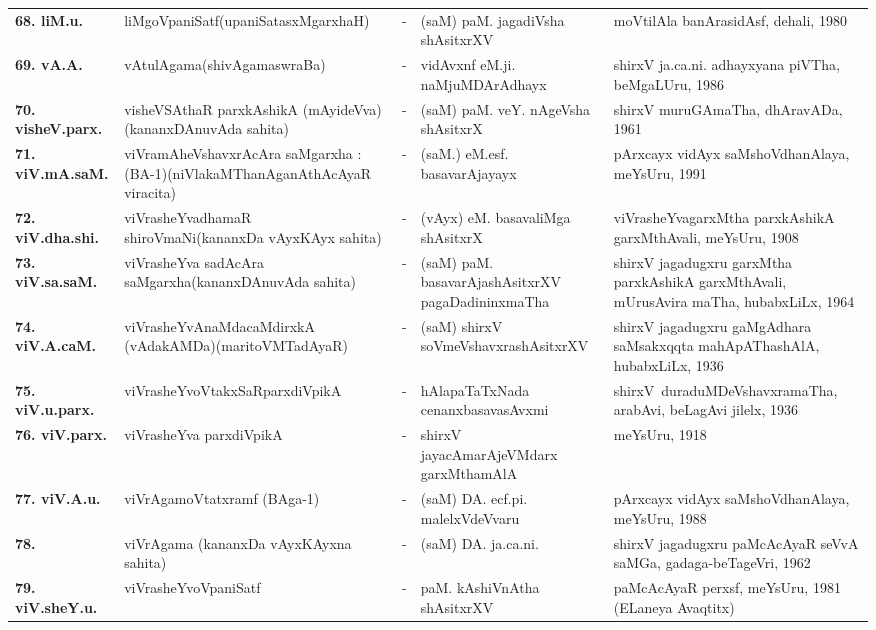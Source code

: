 {\begin{longtable}{lp{5cm}cp{5cm}<{\raggedright}p{3cm}<{\raggedright}@{}}
{\bf 68. liM.u.} & liMgoVpaniSatf\newline (upaniSatasxMgarxhaH) &-& (saM) paM. jagadiVsha shAsitxrXV & moVtilAla banArasidAsf, dehali, 1980\\
{\bf 69. vA.A.} & vAtulAgama\newline (shivAgamaswraBa) &-& vidAvxnf eM.ji. naMjuMDArAdhayx & shirxV ja.ca.ni. adhayxyana piVTha, beMgaLUru, 1986\\
{\bf 70. visheV.parx.} & visheVSAthaR parxkAshikA (mAyideVva)\newline (kananxDAnuvAda sahita) &-& (saM) paM. veY. nAgeVsha shAsitxrX & shirxV muruGAmaTha, dhAravADa, 1961\\
{\bf 71. viV.mA.saM.} & viVramAheVshavxrAcAra saMgarxha : (BA-1)\newline (niVlakaMThanAganAthAcAyaR viracita) &-& (saM.) eM.esf. basavarAjayayx & pArxcayx vidAyx saMshoVdhanAlaya, meYsUru, 1991\\
{\bf 72. viV.dha.shi.} & viVrasheYvadhamaR shiroVmaNi\newline (kananxDa vAyxKAyx sahita) &-& (vAyx) eM. basavaliMga shAsitxrX & viVrasheYvagarxMtha parxkAshikA garxMthAvali, meYsUru, 1908\\
{\bf 73. viV.sa.saM.} & viVrasheYva sadAcAra saMgarxha\newline (kananxDAnuvAda sahita) &-& (saM) paM. basavarAjashAsitxrXV pagaDadininxmaTha & shirxV jagadugxru garxMtha parxkAshikA garxMthAvali, mUrusAvira maTha, hubabxLiLx, 1964\\
{\bf 74. viV.A.caM.} & viVrasheYvAnaMdacaMdirxkA (vAdakAMDa)\newline (maritoVMTadAyaR) &-& (saM) shirxV soVmeVshavxrashAsitxrXV & shirxV jagadugxru gaMgAdhara saMsakxqqta mahApAThashAlA, hubabxLiLx, 1936\\
{\bf 75. viV.u.parx.} & viVrasheYvoVtakxSaRparxdiVpikA &-& hAlapaTaTxNada cenanxbasavasAvxmi & \hbox{shirxV duraduMDeVshavxra}\-maTha, arabAvi, beLagAvi jilelx, 1936\\
{\bf 76. viV.parx.} & viVrasheYva parxdiVpikA &-& shirxV jayacAmarAjeVMdarx garxMthamAlA & meYsUru, 1918\\
{\bf 77. viV.A.u.} & viVrAgamoVtatxramf (BAga-1) &-& (saM) DA. ecf.pi. malelxVdeVvaru & pArxcayx vidAyx saMshoVdhanAlaya, meYsUru, 1988\\
{\bf 78. } & viVrAgama (kananxDa vAyxKAyxna sahita) &-& (saM) DA. ja.ca.ni. & shirxV jagadugxru paMcAcAyaR seVvA saMGa, gadaga-beTageVri, 1962\\
{\bf 79. viV.sheY.u.} & viVrasheYvoVpaniSatf &-& paM. kAshiVnAtha shAsitxrXV & paMcAcAyaR perxsf, meYsUru, 1981 (ELaneya Avaqtitx)\\

\end{longtable}}
